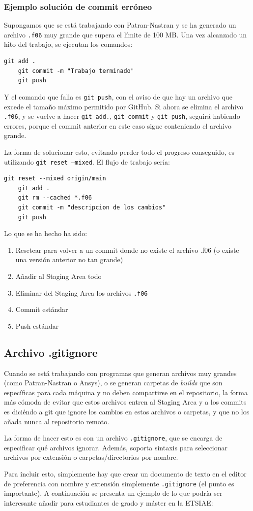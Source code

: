 \documentclass[
twoside,
12pt,                   
]{article}
\begin{document}
\subsubsection{Ejemplo solución de commit erróneo}
Supongamos que se está trabajando con Patran-Nastran y se ha generado un archivo \texttt{.f06} muy grande que supera el límite de 100 MB. Una vez alcanzado un hito del trabajo, se ejecutan los comandos:
\begin{lstlisting}[style=powershell]
    git add .
    git commit -m "Trabajo terminado"
    git push
\end{lstlisting}
Y el comando que falla es \texttt{git push}, con el aviso de que hay un archivo que excede el tamaño máximo permitido por GitHub. Si ahora se elimina el archivo \texttt{.f06}, y se vuelve a hacer \texttt{git add.}, \texttt{git commit} y \texttt{git push}, seguirá habiendo errores, porque el commit anterior en este caso sigue conteniendo el archivo grande.
\par La forma de solucionar esto, evitando perder todo el progreso conseguido, es utilizando \texttt{git reset --mixed}. El flujo de trabajo sería:
\begin{lstlisting}[style=powershell]
    git reset --mixed origin/main
    git add .
    git rm --cached *.f06
    git commit -m "descripcion de los cambios"
    git push
\end{lstlisting}
Lo que se ha hecho ha sido:
\begin{enumerate}
    \item Resetear para volver a un commit donde no existe el archivo .f06 (o existe una versión anterior no tan grande)
    \item Añadir al Staging Area todo
    \item Eliminar del Staging Area los archivos \texttt{.f06}
    \item Commit estándar
    \item Push estándar
\end{enumerate}

\subsection{Archivo .gitignore}
Cuando se está trabajando con programas que generan archivos muy grandes (como Patran-Nastran o Ansys), o se generan carpetas de \textit{builds} que son específicas para cada máquina y no deben compartirse en el repositorio, la forma más cómoda de evitar que estos archivos entren al Staging Area y a los commits es diciéndo a git que ignore los cambios en estos archivos o carpetas, y que no los añada nunca al repositorio remoto.
\par La forma de hacer esto es con un archivo \texttt{.gitignore}, que se encarga de especificar qué archivos ignorar. Además, soporta sintaxis para seleccionar archivos por extensión o carpetas/directorios por nombre.
\par Para incluir esto, simplemente hay que crear un documento de texto en el editor de preferencia con nombre y extensión simplemente \texttt{.gitignore} (el punto es importante). A continuación se presenta un ejemplo de lo que podría ser interesante añadir para estudiantes de grado y máster en la ETSIAE:
\end{document}
